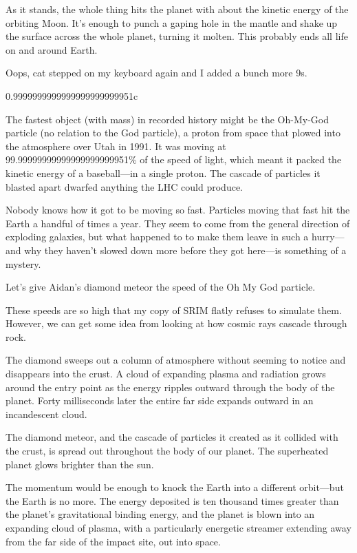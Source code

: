 {As it stands, the whole thing hits the planet with about the kinetic energy of the orbiting Moon. It’s enough to punch a gaping hole in the mantle and shake up the surface across the whole planet, turning it molten. This probably ends all life on and around Earth.}

{Oops, cat stepped on my keyboard again and I added a bunch more 9s.}

{0.9999999999999999999999951c}

{The fastest object (with mass) in recorded history might be the Oh-My-God particle (no relation to the God particle), a proton from space that plowed into the atmosphere over Utah in 1991. It was moving at 99.99999999999999999999951\% of the speed of light, which meant it packed the kinetic energy of a baseball—in a single proton. The cascade of particles it blasted apart dwarfed anything the LHC could produce.}

{Nobody knows how it got to be moving so fast. Particles moving that fast hit the Earth a handful of times a year. They seem to come from the general direction of exploding galaxies, but what happened to to make them leave in such a hurry—and why they haven’t slowed down more before they got here—is something of a mystery.}

{Let’s give Aidan’s diamond meteor the speed of the Oh My God particle.}

{These speeds are so high that my copy of SRIM flatly refuses to simulate them. However, we can get some idea from looking at how cosmic rays cascade through rock.}

{The diamond sweeps out a column of atmosphere without seeming to notice and disappears into the crust. A cloud of expanding plasma and radiation grows around the entry point as the energy ripples outward through the body of the planet. Forty milliseconds later the entire far side expands outward in an incandescent cloud.}

{The diamond meteor, and the cascade of particles it created as it collided with the crust, is spread out throughout the body of our planet. The superheated planet glows brighter than the sun.}

{The momentum would be enough to knock the Earth into a different orbit—but the Earth is no more. The energy deposited is ten thousand times greater than the planet’s gravitational binding energy, and the planet is blown into an expanding cloud of plasma, with a particularly energetic streamer extending away from the far side of the impact site, out into space.}

